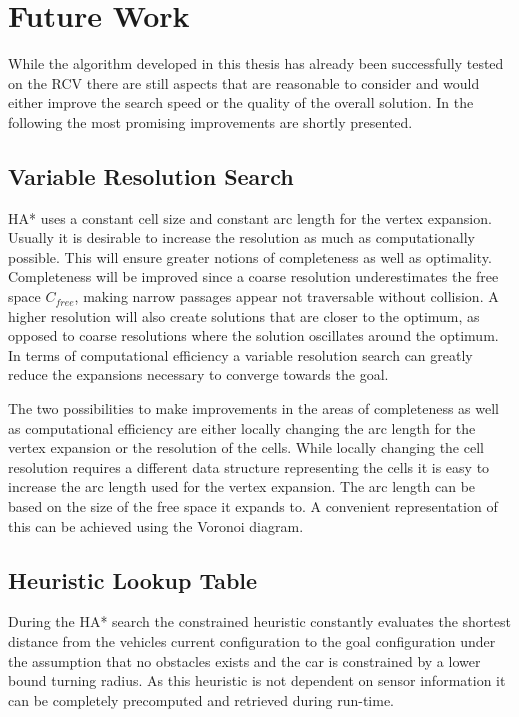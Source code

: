 \chapter{Future Work}
While the algorithm developed in this thesis has already been successfully tested on the RCV there are still aspects that are reasonable to consider and would either improve the search speed or the quality of the overall solution. In the following the most promising improvements are shortly presented.

\section{Variable Resolution Search}
HA* uses a constant cell size and constant arc length for the vertex expansion. Usually it is desirable to increase the resolution as much as computationally possible. This will ensure greater notions of completeness as well as optimality. Completeness will be improved since a coarse resolution underestimates the free space $C_{free}$, making narrow passages appear not traversable without collision. A higher resolution will also create solutions that are closer to the optimum, as opposed to coarse resolutions where the solution oscillates around the optimum. In terms of computational efficiency a variable resolution search can greatly reduce the expansions necessary to converge towards the goal.

The two possibilities to make improvements in the areas of completeness as well as computational efficiency are either locally changing the arc length for the vertex expansion or the resolution of the cells. While locally changing the cell resolution requires a different data structure representing the cells it is easy to increase the arc length used for the vertex expansion. The arc length can be based on the size of the free space it expands to. A convenient representation of this can be achieved using the Voronoi diagram. 

\section{Heuristic Lookup Table}
During the HA* search the constrained heuristic constantly evaluates the shortest distance from the vehicles current configuration to the goal configuration under the assumption that no obstacles exists and the car is constrained by a lower bound turning radius. As this heuristic is not dependent on sensor information it can be completely precomputed and retrieved during run-time.
	
